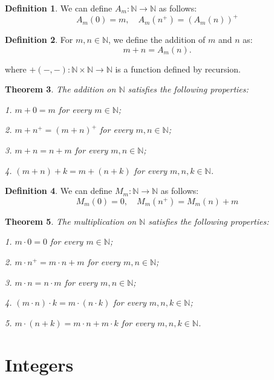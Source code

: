 \documentclass[12pt, reqno]{amsart}
\newtheorem{theorem}{Theorem}[section]
\theoremstyle{definition}
\newtheorem{definition}[theorem]{Definition}
\theoremstyle{remark}
\numberwithin{equation}{section}
\begin{document}
{\begin{definition}
    We can define $A_m: \mathbb{N} \to \mathbb{N}$ as follows:
    \[
        A_m(0) = m, \quad A_m(n^+) = (A_m(n))^+
    \]
\end{definition}

\begin{definition}
    For $m, n \in \mathbb{N}$, we define the addition of $m$ and $n$ as:
    \[
        m + n = A_m(n).
    \]

    where $+(-,-): \mathbb{N} \times \mathbb{N} \to \mathbb{N}$ is a function defined by recursion.
\end{definition}

\begin{theorem}
    The addition on $\mathbb{N}$ satisfies the following properties:

    1. $m + 0 = m$ for every $m\in \mathbb{N}$;

    2. $m + n^+ = (m + n)^+$ for every $m, n \in \mathbb{N}$;

    3. $m + n = n + m$ for every $m, n \in \mathbb{N}$;

    4. $(m + n) + k = m + (n + k)$ for every $m, n, k \in \mathbb{N}$.
\end{theorem}

\begin{definition}
    We can define $M_m: \mathbb{N} \to \mathbb{N}$ as follows:
    \[
        M_m(0) = 0, \quad M_m(n^+) = M_m(n) + m
    \]
\end{definition}

\begin{theorem}
    The multiplication on $\mathbb{N}$ satisfies the following properties:

    1. $m \cdot 0 = 0$ for every $m\in \mathbb{N}$;

    2. $m \cdot n^+ = m \cdot n + m$ for every $m, n \in \mathbb{N}$;

    3. $m \cdot n = n \cdot m$ for every $m, n \in \mathbb{N}$;

    4. $(m \cdot n) \cdot k = m \cdot (n \cdot k)$ for every $m, n, k \in \mathbb{N}$;

    5. $m \cdot (n + k) = m \cdot n + m \cdot k$ for every $m, n, k \in \mathbb{N}$.

\end{theorem}

\section{Integers}

}
\end{document}
